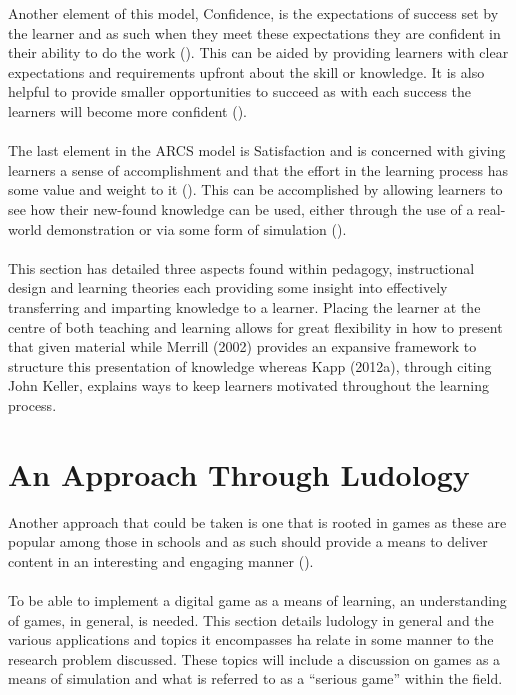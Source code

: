 Another element of this model, Confidence, is the expectations of success set by the learner and as such when they meet these expectations they are confident in their ability to do the work (\cite{Kapp2012a, keller1987development}). This can be aided by providing learners with clear expectations and requirements upfront about the skill or knowledge. It is also helpful to provide smaller opportunities to succeed as with each success the learners will become more confident (\cite{Kapp2012a, keller1987development}).
\\\\
The last element in the ARCS model is Satisfaction and is concerned with giving learners a sense of accomplishment and that the effort in the learning process has some value and weight to it (\cite{Kapp2012a, keller1987development}). This can be accomplished by allowing learners to see how their new-found knowledge can be used, either through the use of a real-world demonstration or via some form of simulation (\cite{Kapp2012a, keller1987development}).
\\\\
This section has detailed three aspects found within pedagogy, instructional design and learning theories each providing some insight into effectively transferring and imparting knowledge to a learner. Placing the learner at the centre of both teaching and learning allows for great flexibility in how to present that given material while Merrill (2002) provides an expansive framework to structure this presentation of knowledge whereas Kapp (2012a), through citing John Keller, explains ways to keep learners motivated throughout the learning process.


\section{An Approach Through Ludology}
Another approach that could be taken is one that is rooted in games as these are popular among those in schools and as such should provide a means to deliver content in an interesting and engaging manner (\cite{Virvou2005}).
\\\\
To be able to implement a digital game as a means of learning, an understanding of games, in general, is needed. This section details ludology in general and the various applications and topics it encompasses ha relate in some manner to the research problem discussed. These topics will include a discussion on games as a means of simulation and what is referred to as a “serious game” within the field. 

